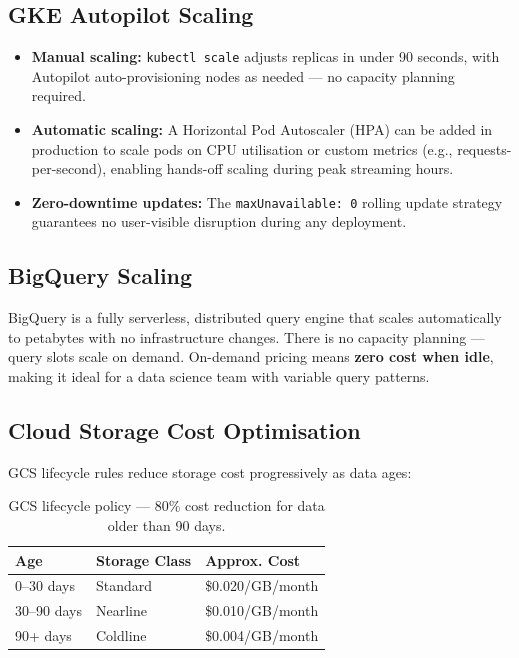 \documentclass[12pt, a4paper]{article}
\begin{document}
\subsection{GKE Autopilot Scaling}

\begin{itemize}
    \item \textbf{Manual scaling:} \texttt{kubectl scale} adjusts replicas in under 90 seconds, with Autopilot auto-provisioning nodes as needed — no capacity planning required.
    \item \textbf{Automatic scaling:} A Horizontal Pod Autoscaler (HPA) can be added in production to scale pods on CPU utilisation or custom metrics (e.g., requests-per-second), enabling hands-off scaling during peak streaming hours.
    \item \textbf{Zero-downtime updates:} The \texttt{maxUnavailable: 0} rolling update strategy guarantees no user-visible disruption during any deployment.
\end{itemize}

\subsection{BigQuery Scaling}

BigQuery is a fully serverless, distributed query engine that scales automatically to petabytes with no infrastructure changes. There is no capacity planning — query slots scale on demand. On-demand pricing means \textbf{zero cost when idle}, making it ideal for a data science team with variable query patterns.

\newpage
\subsection{Cloud Storage Cost Optimisation}

GCS lifecycle rules reduce storage cost progressively as data ages:

\begin{table}[htbp]
\centering
\renewcommand{\arraystretch}{1.4}
\begin{tabular}{lll}
\toprule
\textbf{Age} & \textbf{Storage Class} & \textbf{Approx. Cost} \\
\midrule
0–30 days   & Standard  & \$0.020/GB/month \\
30–90 days  & Nearline   & \$0.010/GB/month \\
90+ days    & Coldline   & \$0.004/GB/month \\
\bottomrule
\end{tabular}
\caption{GCS lifecycle policy — 80\% cost reduction for data older than 90 days.}
\end{table}
\end{document}
